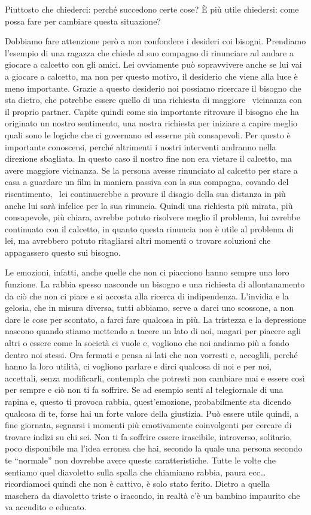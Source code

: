\documentclass[12pt]{book} %
\begin{document}
Piuttosto che chiederci: perché succedono certe cose? È più utile chiedersi: come possa fare per cambiare questa
situazione?

Dobbiamo fare attenzione però a non confondere i desideri coi bisogni. Prendiamo l'esempio di una
ragazza che chiede al suo compagno di rinunciare ad andare a giocare a calcetto con gli amici. Lei ovviamente può
sopravvivere anche se lui vai a giocare a calcetto, ma non per questo motivo, il desiderio che viene alla luce è meno
importante. Grazie a questo desiderio noi possiamo ricercare il bisogno che sta dietro, che potrebbe essere quello di
una richiesta di maggiore \ vicinanza con il proprio partner. Capite quindi come sia importante ritrovare il bisogno
che ha originato un nostro sentimento, una nostra richiesta per iniziare a capire meglio quali sono le logiche che ci
governano ed esserne più consapevoli. Per questo è importante conoscersi, perché altrimenti i nostri interventi
andranno nella direzione sbagliata. In questo caso il nostro fine non era vietare il calcetto, ma avere maggiore
vicinanza. Se la persona avesse rinunciato al calcetto per stare a casa a guardare un film in maniera passiva con la
sua compagna, covando del risentimento, \ lei continuerebbe a provare il disagio della sua distanza in più anche lui
sarà infelice per la sua rinuncia. Quindi una richiesta più mirata, più consapevole, più chiara, avrebbe potuto
risolvere meglio il problema, lui avrebbe continuato con il calcetto, in quanto questa rinuncia non è utile al problema
di lei, ma avrebbero potuto ritagliarsi altri momenti o trovare soluzioni che appagassero questo sui bisogno.

Le emozioni, infatti, anche quelle che non ci piacciono hanno sempre una loro funzione. La rabbia spesso nasconde un
bisogno e una richiesta di allontanamento da ciò che non ci piace e si accosta alla ricerca di indipendenza.
L'invidia e la gelosia, che in misura diversa, tutti abbiamo, serve a darci uno scossone, a non
dare le cose per scontato, a farci fare qualcosa in più. La tristezza e la depressione nascono quando stiamo mettendo a
tacere un lato di noi, magari per piacere agli altri o essere come la società ci vuole e, vogliono che noi andiamo più
a fondo dentro noi stessi. Ora fermati e pensa ai lati che non vorresti e, accoglili, perché hanno la loro utilità, ci
vogliono parlare e dirci qualcosa di noi e per noi, accettali, senza modificarli, contempla che potresti non cambiare
mai e essere così per sempre e ciò non ti fa soffrire. Se ad esempio senti al telegiornale di una rapina e, questo ti
provoca rabbia, quest'emozione, probabilmente sta dicendo qualcosa di te, forse hai un forte
valore della giustizia. Può essere utile quindi, a fine giornata, segnarsi i momenti più emotivamente coinvolgenti per
cercare di trovare indizi su chi sei. Non ti fa soffrire essere irascibile, introverso, solitario, poco disponibile ma
l'idea erronea che hai, secondo la quale una persona secondo te “normale” non dovrebbe avere queste caratteristiche.
Tutte le volte che sentiamo quel diavoletto sulla spalla che chiamiamo rabbia, paura ecc… ricordiamoci quindi che non è
cattivo, è solo stato ferito. Dietro a quella maschera da diavoletto triste o iracondo, in realtà c'è un bambino
impaurito che va accudito e educato.
\end{document}
